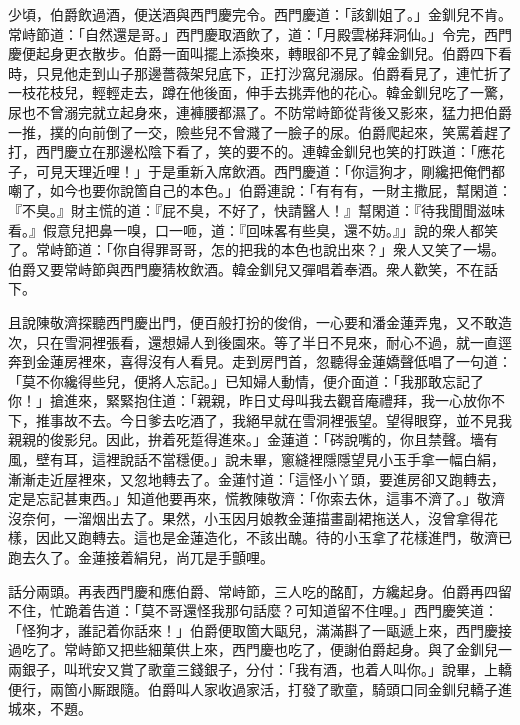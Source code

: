 少頃，伯爵飲過酒，便送酒與西門慶完令。西門慶道：「該釧姐了。」金釧兒不肯。常峙節道：「自然還是哥。」西門慶取酒飲了，道：「月殿雲梯拜洞仙。」令完，西門慶便起身更衣散步。伯爵一面叫擺上添換來，轉眼卻不見了韓金釧兒。伯爵四下看時，只見他走到山子那邊薔薇架兒底下，正打沙窩兒溺尿。伯爵看見了，連忙折了一枝花枝兒，輕輕走去，蹲在他後面，伸手去挑弄他的花心。韓金釧兒吃了一驚，尿也不曾溺完就立起身來，連褲腰都濕了。{}不防常峙節從背後又影來，猛力把伯爵一推，撲的向前倒了一交，險些兒不曾濺了一臉子的尿。{}伯爵爬起來，笑罵着趕了打，西門慶立在那邊松陰下看了，笑的要不的。連韓金釧兒也笑的打跌道：「應花子，可見天理近哩！」于是重新入席飲酒。西門慶道：「你這狗才，剛纔把俺們都嘲了，如今也要你說箇自己的本色。」伯爵連說：「有有有，一財主撒屁，幫閑道：『不臭。』財主慌的道：『屁不臭，不好了，快請醫人！』幫閑道：『待我聞聞滋味看。』假意兒把鼻一嗅，口一咂，{}道：『回味畧有些臭，還不妨。』」說的衆人都笑了。常峙節道：「你自得罪哥哥，怎的把我的本色也說出來？」衆人又笑了一場。伯爵又要常峙節與西門慶猜枚飲酒。韓金釧兒又彈唱着奉酒。衆人歡笑，不在話下。

且說陳敬濟探聽西門慶出門，便百般打扮的俊俏，一心要和潘金蓮弄鬼，又不敢造次，只在雪洞裡張看，還想婦人到後園來。等了半日不見來，耐心不過，就一直逕奔到金蓮房裡來，喜得沒有人看見。走到房門首，忽聽得金蓮嬌聲低唱了一句道：「莫不你纔得些兒，便將人忘記。」{}已知婦人動情，便介面道：「我那敢忘記了你！」搶進來，緊緊抱住道：「親親，昨日丈母叫我去觀音庵禮拜，我一心放你不下，推事故不去。今日爹去吃酒了，我絕早就在雪洞裡張望。望得眼穿，並不見我親親的俊影兒。{}因此，拚着死踅得進來。」金蓮道：「硶說嘴的，你且禁聲。墻有風，壁有耳，這裡說話不當穩便。」說未畢，窻縫裡隱隱望見小玉手拿一幅白絹，漸漸走近屋裡來，又忽地轉去了。金蓮忖道：「這怪小丫頭，要進房卻又跑轉去，定是忘記甚東西。」知道他要再來，慌教陳敬濟：「你索去休，這事不濟了。」敬濟沒奈何，一溜烟出去了。{}果然，小玉因月娘教金蓮描畫副裙拖送人，沒曾拿得花樣，因此又跑轉去。這也是金蓮造化，不該出醜。待的小玉拿了花樣進門，敬濟已跑去久了。金蓮接着絹兒，尚兀是手顫哩。

話分兩頭。再表西門慶和應伯爵、常峙節，三人吃的酩酊，方纔起身。伯爵再四留不住，忙跪着告道：「莫不哥還怪我那句話麼？可知道留不住哩。」西門慶笑道：「怪狗才，誰記着你話來！」伯爵便取箇大甌兒，滿滿斟了一甌遞上來，西門慶接過吃了。常峙節又把些細菓供上來，西門慶也吃了，便謝伯爵起身。與了金釧兒一兩銀子，叫玳安又賞了歌童三錢銀子，分付：「我有酒，也着人叫你。」說畢，上轎便行，兩箇小厮跟隨。伯爵叫人家收過家活，打發了歌童，騎頭口同金釧兒轎子進城來，不題。

